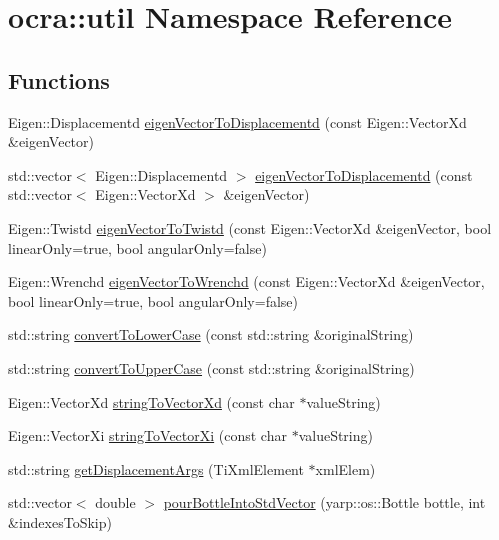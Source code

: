 \hypertarget{namespaceocra_1_1util}{}\section{ocra\+:\+:util Namespace Reference}
\label{namespaceocra_1_1util}
\subsection*{Functions}
\begin{DoxyCompactItemize}
\item 
Eigen\+::\+Displacementd \hyperlink{namespaceocra_1_1util_a64b5072529ea69c67bc426e571972087}{eigen\+Vector\+To\+Displacementd} (const Eigen\+::\+Vector\+Xd \&eigen\+Vector)
\item 
std\+::vector$<$ Eigen\+::\+Displacementd $>$ \hyperlink{namespaceocra_1_1util_aa7cf44a7c937b97604d2765f2283e706}{eigen\+Vector\+To\+Displacementd} (const std\+::vector$<$ Eigen\+::\+Vector\+Xd $>$ \&eigen\+Vector)
\item 
Eigen\+::\+Twistd \hyperlink{namespaceocra_1_1util_acc4ef0218e3bb719ff6444afbed77c71}{eigen\+Vector\+To\+Twistd} (const Eigen\+::\+Vector\+Xd \&eigen\+Vector, bool linear\+Only=true, bool angular\+Only=false)
\item 
Eigen\+::\+Wrenchd \hyperlink{namespaceocra_1_1util_a16659a9542a5680a4704e4b9f8896b24}{eigen\+Vector\+To\+Wrenchd} (const Eigen\+::\+Vector\+Xd \&eigen\+Vector, bool linear\+Only=true, bool angular\+Only=false)
\item 
std\+::string \hyperlink{namespaceocra_1_1util_a52405129ed430671a96cedd22bbfbd07}{convert\+To\+Lower\+Case} (const std\+::string \&original\+String)
\item 
std\+::string \hyperlink{namespaceocra_1_1util_a98431f64f2119e4cb762c39e7959a531}{convert\+To\+Upper\+Case} (const std\+::string \&original\+String)
\item 
Eigen\+::\+Vector\+Xd \hyperlink{namespaceocra_1_1util_a34b1e831cf424dfc9bbd089e30f1ae32}{string\+To\+Vector\+Xd} (const char $\ast$value\+String)
\item 
Eigen\+::\+Vector\+Xi \hyperlink{namespaceocra_1_1util_a9ae02be8142f960af91a4db9bbf78820}{string\+To\+Vector\+Xi} (const char $\ast$value\+String)
\item 
std\+::string \hyperlink{namespaceocra_1_1util_a56277b8b7b0af28ba5eb7d5e952493e2}{get\+Displacement\+Args} (Ti\+Xml\+Element $\ast$xml\+Elem)
\item 
std\+::vector$<$ double $>$ \hyperlink{namespaceocra_1_1util_ae43554408032d294cf5486321de608ad}{pour\+Bottle\+Into\+Std\+Vector} (yarp\+::os\+::\+Bottle bottle, int \&indexes\+To\+Skip)

\end{DoxyCompactItemize}
